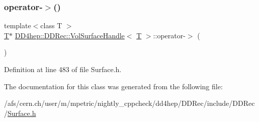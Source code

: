 \subsubsection{\texorpdfstring{operator-\/$>$()}{operator->()}}
{\footnotesize\ttfamily template$<$class T $>$ \\
\hyperlink{class_t}{T}$\ast$ \hyperlink{class_d_d4hep_1_1_d_d_rec_1_1_vol_surface_handle}{D\+D4hep\+::\+D\+D\+Rec\+::\+Vol\+Surface\+Handle}$<$ \hyperlink{class_t}{T} $>$\+::operator-\/$>$ (\begin{DoxyParamCaption}{ }\end{DoxyParamCaption})\hspace{0.3cm}{\ttfamily [inline]}}



Definition at line 483 of file Surface.\+h.



The documentation for this class was generated from the following file\+:\begin{DoxyCompactItemize}
\item 
/afs/cern.\+ch/user/m/mpetric/nightly\+\_\+cppcheck/dd4hep/\+D\+D\+Rec/include/\+D\+D\+Rec/\hyperlink{_surface_8h}{Surface.\+h}\end{DoxyCompactItemize}
